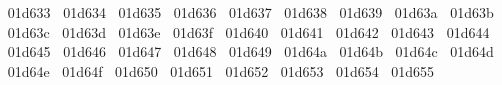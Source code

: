 {  ^^^^^^01d633%
  ^^^^^^01d634%
  ^^^^^^01d635%
  ^^^^^^01d636%
  ^^^^^^01d637%
  ^^^^^^01d638%
  ^^^^^^01d639%
  ^^^^^^01d63a%
  ^^^^^^01d63b%
  ^^^^^^01d63c%
  ^^^^^^01d63d%
  ^^^^^^01d63e%
  ^^^^^^01d63f%
  ^^^^^^01d640%
  ^^^^^^01d641%
  ^^^^^^01d642%
  ^^^^^^01d643%
  ^^^^^^01d644%
  ^^^^^^01d645%
  ^^^^^^01d646%
  ^^^^^^01d647%
  ^^^^^^01d648%
  ^^^^^^01d649%
  ^^^^^^01d64a%
  ^^^^^^01d64b%
  ^^^^^^01d64c%
  ^^^^^^01d64d%
  ^^^^^^01d64e%
  ^^^^^^01d64f%
  ^^^^^^01d650%
  ^^^^^^01d651%
  ^^^^^^01d652%
  ^^^^^^01d653%
  ^^^^^^01d654%
  ^^^^^^01d655%
}
